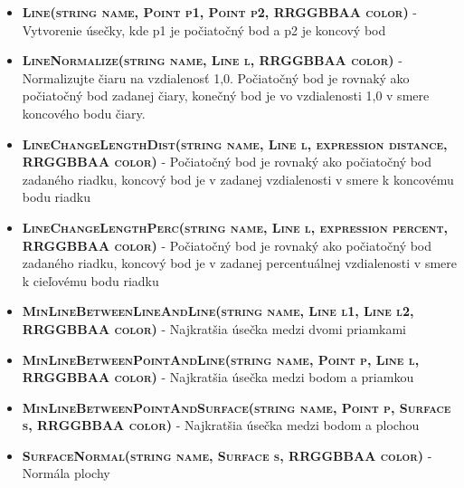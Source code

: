 \begin{itemize}
\item \textsc{\textbf{Line(string name, Point p1, Point p2, RRGGBBAA color)}}  - Vytvorenie úsečky, kde p1 je počiatočný bod a p2 je koncový bod %

\item \textsc{\textbf{LineNormalize(string name, Line l, RRGGBBAA color)}} - Normalizujte čiaru na vzdialenosť 1,0. Počiatočný bod je rovnaký ako počiatočný bod zadanej čiary, konečný bod je vo vzdialenosti 1,0 v smere koncového bodu čiary. %

\item \textsc{\textbf{LineChangeLengthDist(string name, Line l, expression distance, RRGGBBAA color)}} - Počiatočný bod je rovnaký ako počiatočný bod zadaného riadku, koncový bod je v zadanej vzdialenosti v smere k koncovému bodu riadku%
		
\item \textsc{\textbf{LineChangeLengthPerc(string name, Line l, expression percent, RRGGBBAA color)}} - Počiatočný bod je rovnaký ako počiatočný bod zadaného riadku, koncový bod je v zadanej percentuálnej vzdialenosti v smere k cieľovému bodu riadku %



		
\item \textsc{\textbf{MinLineBetweenLineAndLine(string name, Line l1, Line l2, RRGGBBAA color)}} - Najkratšia úsečka medzi dvomi priamkami%
		
\item \textsc{\textbf{MinLineBetweenPointAndLine(string name, Point p, Line l, RRGGBBAA color)}} - Najkratšia úsečka medzi bodom a priamkou
		
\item \textsc{\textbf{MinLineBetweenPointAndSurface(string name, Point p, Surface s, RRGGBBAA color)}} - Najkratšia úsečka medzi bodom a plochou%


\item \textsc{\textbf{SurfaceNormal(string name, Surface s, RRGGBBAA color)}}  - Normála plochy%




\end{itemize}
